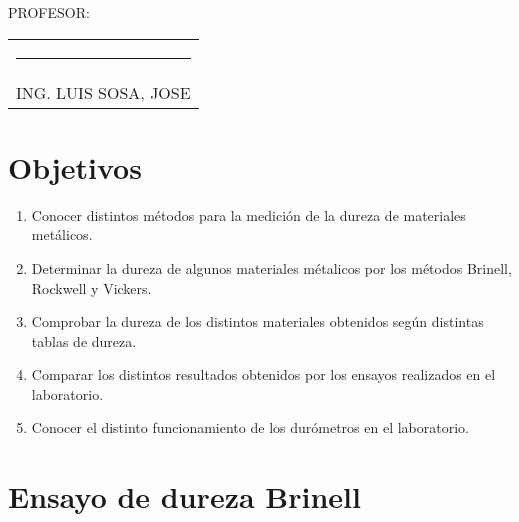 \documentclass[a4paper,12pt]{report}
\begin{document}
{\large PROFESOR:} \\[1.15cm]
\begin{center}
\begin{tabular}{c}
\rule[3pt]{4.8in}{1pt}\\[1pt]
ING. LUIS SOSA, JOSE 
\end{tabular}
\end{center}
\vfill
\newpage
\tableofcontents
\newpage
\listoftables
{} %
\listoffigures
{}

\chapter{Objetivos}
\begin{enumerate}
\item Conocer distintos métodos para la medición de la dureza de materiales metálicos.
\item Determinar la dureza de algunos materiales métalicos por los métodos Brinell, Rockwell y Vickers.
\item Comprobar la dureza de los distintos materiales obtenidos según distintas tablas de dureza.
\item Comparar los distintos resultados obtenidos por los ensayos realizados en el laboratorio.
\item Conocer el distinto funcionamiento de los durómetros en el laboratorio.
\end{enumerate}
\setcounter{page}{1}  %
\chapter{Ensayo de dureza Brinell}
\end{document}
